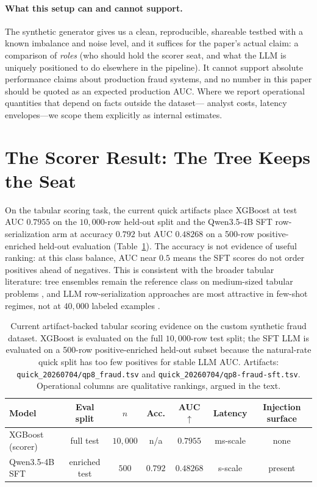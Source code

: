\documentclass{article}
\providecommand{\tableref}[1]{Table~\ref{#1}}
\begin{document}
\paragraph{What this setup can and cannot support.}
The synthetic generator gives us a clean, reproducible, shareable testbed with
a known imbalance and noise level, and it suffices for the paper's actual
claim: a comparison of \emph{roles} (who should hold the scorer seat, and what
the LLM is uniquely positioned to do elsewhere in the pipeline). It cannot
support absolute performance claims about production fraud systems, and no
number in this paper should be quoted as an expected production AUC. Where we
report operational quantities that depend on facts outside the dataset---
analyst costs, latency envelopes---we scope them explicitly as internal
estimates.
 \section{The Scorer Result: The Tree Keeps the Seat}
\label{sec:p8-scorer}

On the tabular scoring task, the current quick artifacts place XGBoost at test
AUC $0.7955$ on the $10{,}000$-row held-out split and the Qwen3.5-4B SFT
row-serialization arm at accuracy $0.792$ but AUC $0.48268$ on a 500-row
positive-enriched held-out evaluation (\tableref{tab:p8-headtohead}). The
accuracy is not evidence of useful ranking: at this class balance, AUC near
$0.5$ means the SFT scores do not order positives ahead of negatives. This is
consistent with the broader tabular literature: tree ensembles
remain the reference class on medium-sized tabular problems
\citep{grinsztajn2022tree, shwartzziv2021tabular}, and LLM row-serialization
approaches are most attractive in few-shot regimes, not at $40{,}000$ labeled
examples \citep{hegselmann2023tabllm}.

\begin{table}[t]
\centering
\caption{Current artifact-backed tabular scoring evidence on the custom
synthetic fraud dataset. XGBoost is evaluated on the full $10{,}000$-row test
split; the SFT LLM is evaluated on a 500-row positive-enriched held-out subset
because the natural-rate quick split has too few positives for stable LLM AUC.
Artifacts: \texttt{quick\_20260704/qp8\_fraud.tsv} and
\texttt{quick\_20260704/qp8-fraud-sft.tsv}. Operational columns are qualitative
rankings, argued in the text.}
\label{tab:p8-headtohead}
\small
\begin{tabular}{lcccccc}
\toprule
Model & Eval split & $n$ & Acc. & AUC $\uparrow$ & Latency & Injection surface \\
\midrule
XGBoost (scorer) & full test & $10{,}000$ & n/a & $\mathbf{0.7955}$ & ms-scale & none \\
Qwen3.5-4B SFT   & enriched test & $500$ & $0.792$ & $0.48268$ & s-scale & present \\
\bottomrule
\end{tabular}
\end{table}
\end{document}
